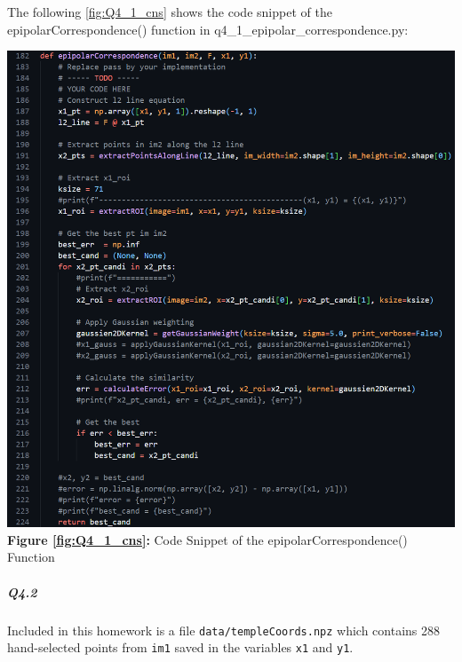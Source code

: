 \begin{your_solution}[title=Q4.1 continued,height=21.5cm,width=\linewidth]
	The following \autoref{fig:Q4_1_cns} shows the code snippet of the epipolarCorrespondence() function in q4\_1\_epipolar\_correspondence.py:	
	\newline
	
	
	\begin{minipage}{1\linewidth}
		\centering
		\includegraphics[width=1\linewidth, height=1.2\columnwidth]{../Q4_1_cns.png}
		\textbf{Figure \ref{fig:Q4_1_cns}:} Code Snippet of the epipolarCorrespondence() Function  %
		\label{fig:Q4_1_cns}         %
	\end{minipage}
\end{your_solution}

\subparagraph*{Q4.2}
Included in this homework  is a file \texttt{data/templeCoords.npz} which contains 288 hand-selected points from \verb!im1! saved in the variables \verb!x1! and \verb!y1!.


